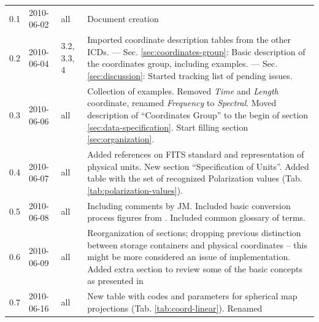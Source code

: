 \documentclass[a4paper,10pt,bibtotoc]{scrreprt}
\begin{document}
\begin{center}
  \tablelasttail{\hline}
  \begin{supertabular}{lllp{10cm}}
    \shrinkheight{-4em}
    0.1 & 2010-06-02 & all & Document creation \\
    0.2 & 2010-06-04 & 3.2, 3.3, 4 &
    Imported coordinate description tables from the other ICDs.  --- 
    Sec. \ref{sec:coordinates-group}: Basic description of the
    coordinates group, including examples. ---
    Sec. \ref{sec:discussion}: Started tracking list of pending issues. \\
    0.3 & 2010-06-06 & all & Collection of examples. Removed \textsl{Time}
    and \textsl{Length} coordinate, renamed \textsl{Frequency} to
    \textsl{Spectral}. Moved description of ``Coordinates Group'' to the
    begin of section \ref{sec:data-specification}. Start filling section
    \ref{sec:organization}. \\
    0.4 & 2010-06-07 & all & Added references on FITS standard and representation
    of physical units. New section ``Specification of Units''.  Added table with
    the set of recognized Polarization values (Tab. \ref{tab:polarization-values}). \\
    0.5 & 2010-06-08 & all & Including comments by JM. Included basic
    conversion process figures from \cite{fits.paper1, fits.paper2}. 
    Included common glossary of terms. \\
    0.6 & 2010-06-09 & all & Reorganization of sections; dropping previous
    distinction between storage containers and physical coordinates -- this
    might be more considered an issue of implementation. Added extra section to
    review some of the basic concepts as presented in \cite{fits.paper1,
      fits.paper2, fits.paper3} \\
    0.7 & 2010-06-16 & all & New table with codes and parameters for
    spherical map projections (Tab. \ref{tab:coord-linear}). Renamed

\end{supertabular}
\end{center}
\end{document}
